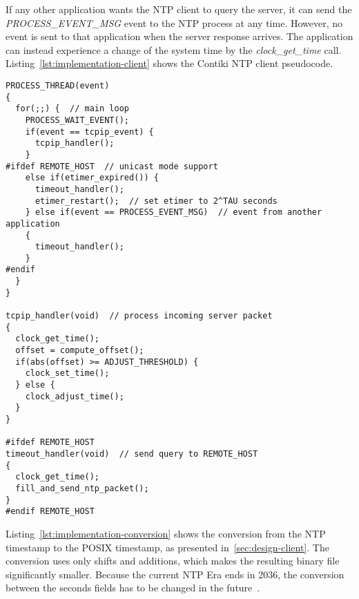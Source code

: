 If any other application wants the NTP client to query the server,
it can send the {\it{PROCESS\_EVENT\_MSG}} event to the NTP process at any time.
However, no event is sent to that application when the server response arrives.
The application can instead experience a change of
the system time by the {\it{clock\_get\_time}} call.
Listing~\ref{lst:implementation-client} shows the Contiki NTP client pseudocode.
\newpage
\begin{lstlisting}[caption={NTP client pseudocode},label={lst:implementation-client}]
PROCESS_THREAD(event)
{
  for(;;) {  // main loop
    PROCESS_WAIT_EVENT();
    if(event == tcpip_event) {
      tcpip_handler();
    }
#ifdef REMOTE_HOST  // unicast mode support
    else if(etimer_expired()) {
      timeout_handler();
      etimer_restart();  // set etimer to 2^TAU seconds
    } else if(event == PROCESS_EVENT_MSG)  // event from another application
    {
      timeout_handler();
    }
#endif
  }
}

tcpip_handler(void)  // process incoming server packet
{
  clock_get_time();
  offset = compute_offset();
  if(abs(offset) >= ADJUST_THRESHOLD) {
    clock_set_time();
  } else {
    clock_adjust_time();
  }
}

#ifdef REMOTE_HOST
timeout_handler(void)  // send query to REMOTE_HOST
{
  clock_get_time();
  fill_and_send_ntp_packet();
}
#endif REMOTE_HOST
\end{lstlisting}

Listing~\ref{lst:implementation-conversion} shows the conversion from the NTP timestamp to the POSIX timestamp,
as presented in~\ref{sec:design-client}.
The conversion uses only shifts and additions, which makes the resulting binary file
significantly smaller.
Because the current NTP Era ends in 2036,
the conversion between the seconds fields has to be changed in the future~\cite{ntp-y2k}.

